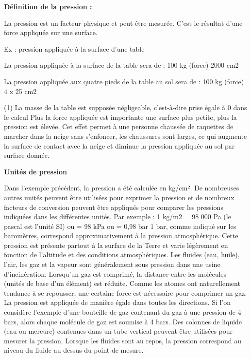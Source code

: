 \textbf{Définition de la pression :} 
\vspace{0.3cm}

La pression est un facteur physique et peut être mesurée. C'est le résultat d'une force appliquée sur une surface.

Ex : pression appliquée à la surface d'une table

La pression appliquée à la surface de la table sera de : 
100 kg (force)
2000 cm2

 

La pression appliquée aux quatre 
pieds de la table au sol sera de : 
100 kg (force)
4 x 25 cm2


(1) La masse de la table est supposée 
négligeable, c'est-à-dire prise égale à 0 dans le calcul
Plus la force appliquée est importante une surface plus petite, plus la pression est élevée.
Cet effet permet à une personne chaussée de raquettes de marcher dans la neige sans s'enfoncer, les chaussures sont larges, ce qui augmente la surface de contact avec la neige et diminue la pression appliquée au sol par surface donnée.

\vspace{0.3cm}
\textbf{Unités de pression}


Dans l'exemple précédent, la pression a été calculée en kg/cm². De nombreuses autres unités peuvent être utilisées pour exprimer la pression et de nombreux facteurs de conversion peuvent être appliqués pour comparer les pressions indiquées dans les différentes unités.
\vspace{0.3cm}
Par exemple :
1 kg/m2 = 98 000 Pa (le pascal est l'unité SI)
ou = 98 kPa
ou = 0,98 bar
\vspace{0.3cm}
1 bar, comme indiqué sur les baromètres, correspond approximativement à la pression atmosphérique. Cette pression est présente partout à la surface de la Terre et varie légèrement en fonction de l'altitude et des conditions atmosphériques.
Les fluides (eau, huile), l'air, les gaz et la vapeur sont généralement sous pression dans une usine d'incinération. 
Lorsqu'un gaz est comprimé, la distance entre les molécules (unités de base d'un élément) est réduite. Comme les atomes ont naturellement tendance à se repousser, une certaine force est nécessaire pour comprimer un gaz.
\vspace{0.3cm}
La pression est appliquée de manière égale dans toutes les directions. Si l'on considère l'exemple d'une bouteille de gaz contenant du gaz à une pression de 4 bars, alors chaque molécule de gaz est soumise à 4 bars.
Des colonnes de liquide (eau ou mercure) contenues dans un tube vertical peuvent être utilisées pour mesurer la pression. Lorsque les fluides sont au repos, la pression correspond au niveau du fluide au dessus du point de mesure.




